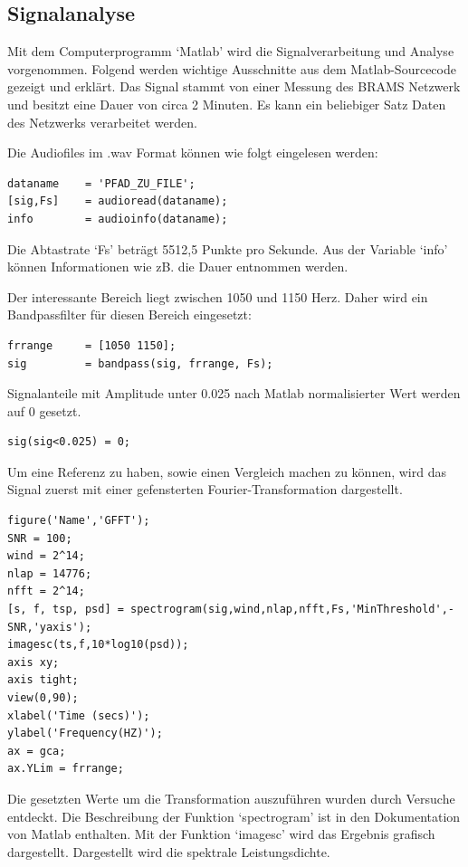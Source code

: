 \begin{refsection}
\subsection{Signalanalyse}
Mit dem Computerprogramm `Matlab' wird die Signalverarbeitung und Analyse vorgenommen.
Folgend werden wichtige Ausschnitte aus dem Matlab-Sourcecode gezeigt und erklärt.
Das Signal stammt von einer Messung des BRAMS Netzwerk und besitzt eine Dauer von circa 2 Minuten.
Es kann ein beliebiger Satz Daten des Netzwerks verarbeitet werden.

Die Audiofiles im .wav Format können wie folgt eingelesen werden:
\begin{lstlisting}
dataname    = 'PFAD_ZU_FILE';
[sig,Fs]    = audioread(dataname);
info        = audioinfo(dataname);
\end{lstlisting}
Die Abtastrate `Fs' beträgt 5512,5 Punkte pro Sekunde.
Aus der Variable `info' können Informationen wie zB. die Dauer entnommen werden. 

Der interessante Bereich liegt zwischen 1050 und 1150 Herz.
Daher wird ein Bandpassfilter für diesen Bereich eingesetzt:
\begin{lstlisting}
frrange     = [1050 1150];
sig         = bandpass(sig, frrange, Fs);
\end{lstlisting}

Signalanteile mit Amplitude unter 0.025 nach Matlab normalisierter Wert werden auf 0 gesetzt.
\begin{lstlisting}
sig(sig<0.025) = 0;
\end{lstlisting}

Um eine Referenz zu haben, sowie einen Vergleich machen zu können, wird das Signal zuerst mit einer gefensterten Fourier-Transformation dargestellt. 
\begin{lstlisting}
figure('Name','GFFT');
SNR = 100;
wind = 2^14;
nlap = 14776;
nfft = 2^14;
[s, f, tsp, psd] = spectrogram(sig,wind,nlap,nfft,Fs,'MinThreshold',-SNR,'yaxis');
imagesc(ts,f,10*log10(psd));
axis xy; 
axis tight; 
view(0,90);
xlabel('Time (secs)');
ylabel('Frequency(HZ)');
ax = gca;
ax.YLim = frrange;
\end{lstlisting}
Die gesetzten Werte um die Transformation auszuführen wurden durch Versuche entdeckt. 
Die Beschreibung der Funktion `spectrogram' ist in den Dokumentation von Matlab enthalten.
Mit der Funktion `imagesc' wird das Ergebnis grafisch dargestellt.
Dargestellt wird die spektrale Leistungsdichte.


\end{refsection}
